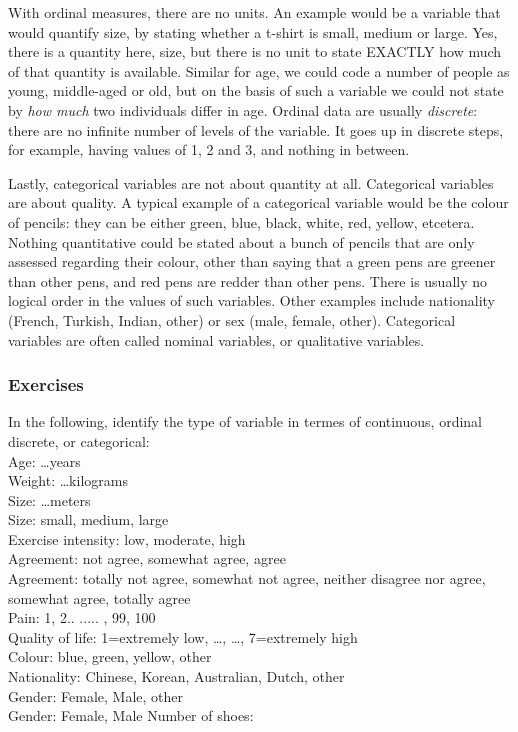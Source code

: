 \documentclass[]{report}\usepackage[]{graphicx}\usepackage[]{color}
\begin{document}
With ordinal measures, there are no units. An example would be a variable that would quantify size, by stating whether a t-shirt is small, medium or large. Yes, there is a quantity here, size, but there is no unit to state EXACTLY how much of that quantity is available. Similar for age, we could code a number of people as young, middle-aged or old, but on the basis of such a variable we could not state by \textit{how much} two individuals differ in age. Ordinal data are usually \textit{discrete}: there are no infinite number of levels of the variable. It goes up in discrete steps, for example, having values of 1, 2 and 3, and nothing in between.

Lastly, categorical variables are not about quantity at all. Categorical variables are about quality. A typical example of a categorical variable would be the colour of pencils: they can be either green, blue, black, white, red, yellow, etcetera. Nothing quantitative could be stated about a bunch of pencils that are only assessed regarding their colour, other than saying that a green pens are greener than other pens, and red pens are redder than other pens. There is usually no logical order in the values of such variables. Other examples include nationality (French, Turkish, Indian, other) or sex (male, female, other). Categorical variables are often called nominal variables, or qualitative variables.

\subsubsection{Exercises} 
In the following, identify the type of variable in termes of continuous, ordinal discrete, or categorical:\\
Age: \dots years\\
Weight: \dots kilograms\\
Size: \dots meters\\
Size: small, medium, large\\
Exercise intensity: low, moderate, high\\
Agreement: not agree, somewhat agree, agree\\
Agreement: totally not agree, somewhat not agree, neither disagree nor agree, somewhat agree, totally agree\\
Pain: 1, 2.. ..... , 99, 100\\
Quality of life: 1=extremely low, \dots, \dots, 7=extremely high\\
Colour: blue, green, yellow, other\\
Nationality: Chinese, Korean, Australian, Dutch, other\\
Gender: Female, Male, other \\
Gender: Female, Male
Number of shoes: \\
\end{document}
